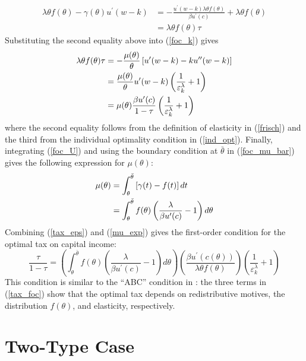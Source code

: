 \documentclass[11pt]{article}
\newcommand{\p}{\prime}
\begin{document}
\begin{align*}
    \lambda \theta f(\theta) - \gamma(\theta)u^\p(w - k) &= -\frac{u^\p(w - k)\lambda\theta f(\theta)}{\beta u^\p(c)} + \lambda\theta f(\theta) \\
    &= \lambda\theta f(\theta)\tau
\end{align*}
Substituting the second equality above into (\ref{foc_k}) gives 
\begin{align}
    \lambda\theta f(\theta)\tau &= -\frac{\mu(\theta)}{\theta}\left[ u^\p(w - k) - ku^{\p\p}(w - k) \right] \notag \\
    &= \frac{\mu(\theta)}{\theta} u^\p(w - k)\left( \frac{1}{\varepsilon_k^\lambda} + 1 \right) \notag \\
    &= \mu(\theta)\frac{\beta u^\p(c)}{1 - \tau} \left( \frac{1}{\varepsilon_k^\lambda} + 1 \right) \label{tax_eps}
\end{align}
where the second equality follows from the definition of elasticity in (\ref{frisch}) and the third from the individual optimality condition in (\ref{ind_opt}). Finally, integrating (\ref{foc_U}) and using the boundary condition at \( \bar{\theta} \) in (\ref{foc_mu_bar}) gives the following expression for \( \mu(\theta) \):
\begin{align}
    \mu(\theta) &= \int_{\theta}^{\bar{\theta}} \left[ \gamma(t) - f(t) \right]dt \notag \\ 
    &= \int_{\theta}^{\bar{\theta}} f(\theta)\left( \frac{\lambda}{\beta u^\p(c)} - 1 \right)d\theta \label{mu_exp}
\end{align}
Combining (\ref{tax_eps}) and (\ref{mu_exp}) gives the first-order condition for the optimal tax on capital income:
\begin{equation}
    \frac{\tau}{1 - \tau} = \left( \int_{\theta}^{\bar{\theta}} f(\theta)\left( \frac{\lambda}{\beta u^\p(c)} - 1 \right)d\theta \right)\left(\frac{\beta u^\p(c(\theta))}{\lambda \theta f(\theta)}\right)\left( \frac{1}{\varepsilon_k^\lambda} + 1 \right) \label{tax_foc}
\end{equation}
This condition is similar to the ``ABC'' condition in \cite{diamond1998optimal}: the three terms in (\ref{tax_foc}) show that the optimal tax depends on redistributive motives, the distribution \( f(\theta) \), and elasticity, respectively. 

\section{Two-Type Case}
\end{document}
